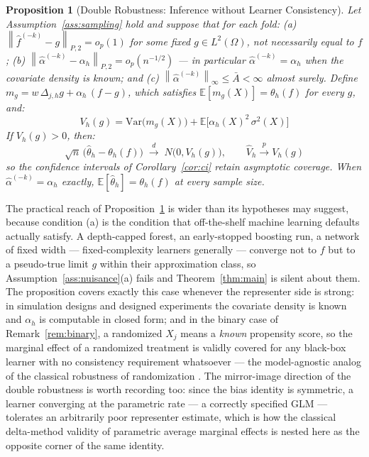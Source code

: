 \documentclass[12pt]{article}
\newtheorem{proposition}{Proposition}
\newcommand{\norm}[1]{\left\| #1 \right\|}
\newcommand{\E}{\mathbb{E}}
\newcommand{\xrightarrowp}{\xrightarrow{p}}
\newcommand{\Dh}{\Delta_{j,h}}
\newcommand{\Ptwo}[1]{\norm{#1}_{P,2}}
\begin{document}
	\begin{proposition}[Double Robustness: Inference without Learner Consistency]
		\label{prop:robust}
		Let Assumption~\ref{ass:sampling} hold and suppose that for each fold:
		(a) $\Ptwo{\hat{f}^{(-k)} - g} = o_p(1)$ for some fixed $g \in L^2(\Omega)$,
		\emph{not necessarily equal to $f$};
		(b) $\Ptwo{\hat{\alpha}^{(-k)} - \alpha_h} = o_p(n^{-1/2})$ --- in particular
		$\hat{\alpha}^{(-k)} = \alpha_h$ when the covariate density is known; and
		(c) $\norm{\hat{\alpha}^{(-k)}}_\infty \leq \bar{A} < \infty$ almost surely.
		Define $m_g = w\, \Dh g + \alpha_h\,(f - g)$, which satisfies
		$\E[m_g(X)] = \theta_h(f)$ for every $g$, and:
		\begin{equation}
			V_h(g) = \mathrm{Var}\bigl(m_g(X)\bigr)
			+ \E\bigl[\alpha_h(X)^2\, \sigma^2(X)\bigr]
			\label{eq:vrobust}
		\end{equation}
		If $V_h(g) > 0$, then:
		\begin{equation}
			\sqrt{n}\,\bigl(\hat{\theta}_h - \theta_h(f)\bigr)
			\;\xrightarrow{d}\; N\bigl(0, V_h(g)\bigr),
			\qquad
			\hat{V}_h \xrightarrowp V_h(g)
		\end{equation}
		so the confidence intervals of Corollary~\ref{cor:ci} retain asymptotic
		coverage. When $\hat{\alpha}^{(-k)} = \alpha_h$ exactly,
		$\E[\hat{\theta}_h] = \theta_h(f)$ at every sample size.
	\end{proposition}
	
	The practical reach of Proposition~\ref{prop:robust} is wider than its hypotheses
	may suggest, because condition (a) is the condition that off-the-shelf machine
	learning defaults actually satisfy. A depth-capped forest, an early-stopped
	boosting run, a network of fixed width --- fixed-complexity learners generally ---
	converge not to $f$ but to a pseudo-true limit $g$ within their approximation
	class, so Assumption~\ref{ass:nuisance}(a) fails and Theorem~\ref{thm:main} is
	silent about them. The proposition covers exactly this case whenever the
	representer side is strong: in simulation designs and designed experiments the
	covariate density is known and $\alpha_h$ is computable in closed form; and in the
	binary case of Remark~\ref{rem:binary}, a randomized $X_j$ means a \emph{known}
	propensity score, so the marginal effect of a randomized treatment is validly
	covered for any black-box learner with no consistency requirement whatsoever ---
	the model-agnostic analog of the classical robustness of randomization
	\citep{robins1994}. The mirror-image direction of the double robustness is worth
	recording too: since the bias identity is symmetric, a learner converging at the
	parametric rate --- a correctly specified GLM --- tolerates an arbitrarily poor
	representer estimate, which is how the classical delta-method validity of
	parametric average marginal effects is nested here as the opposite corner of the
	same identity.
	
\end{document}
